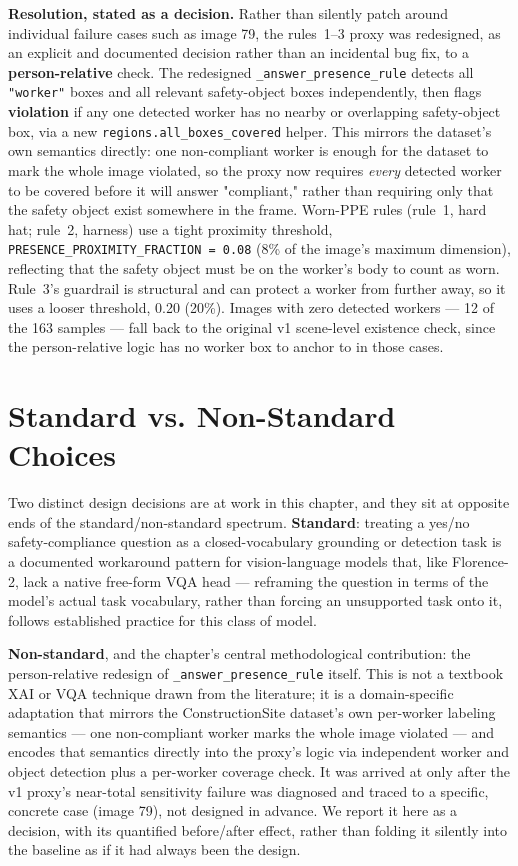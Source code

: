 \textbf{Resolution, stated as a decision.} Rather than silently patch around individual failure
cases such as image 79, the rules~1--3 proxy was redesigned, as an explicit and documented decision
rather than an incidental bug fix, to a \textbf{person-relative} check. The redesigned
\texttt{\_answer\_presence\_rule} detects all \texttt{"worker"} boxes and all relevant safety-object
boxes independently, then flags \textbf{violation} if any one detected worker has no nearby or
overlapping safety-object box, via a new \texttt{regions.all\_boxes\_covered} helper. This
mirrors the dataset's own semantics directly: one non-compliant worker is enough for the dataset to
mark the whole image violated, so the proxy now requires \emph{every} detected worker to be covered
before it will answer "compliant," rather than requiring only that the safety object exist
somewhere in the frame. Worn-PPE rules (rule~1, hard hat; rule~2, harness) use a tight proximity
threshold, \texttt{PRESENCE\_PROXIMITY\_FRACTION = 0.08} (8\% of the image's maximum dimension),
reflecting that the safety object must be on the worker's body to count as worn. Rule~3's
guardrail is structural and can protect a worker from further away, so it uses a looser threshold,
0.20 (20\%). Images with zero detected workers --- 12 of the 163 samples --- fall back to the
original v1 scene-level existence check, since the person-relative logic has no worker box to
anchor to in those cases.

\section{Standard vs. Non-Standard Choices}

Two distinct design decisions are at work in this chapter, and they sit at opposite ends of the
standard/non-standard spectrum. \textbf{Standard}: treating a yes/no safety-compliance question as
a closed-vocabulary grounding or detection task is a documented workaround pattern for
vision-language models that, like Florence-2, lack a native free-form VQA head --- reframing the
question in terms of the model's actual task vocabulary, rather than forcing an unsupported task
onto it, follows established practice for this class of model.

\textbf{Non-standard}, and the chapter's central methodological contribution: the person-relative
redesign of \texttt{\_answer\_presence\_rule} itself. This is not a textbook XAI or VQA technique
drawn from the literature; it is a domain-specific adaptation that mirrors the ConstructionSite
dataset's own per-worker labeling semantics --- one non-compliant worker marks the whole image
violated --- and encodes that semantics directly into the proxy's logic via independent worker and
object detection plus a per-worker coverage check. It was arrived at only after the v1 proxy's
near-total sensitivity failure was diagnosed and traced to a specific, concrete case (image 79), not
designed in advance. We report it here as a decision, with its quantified before/after effect, rather
than folding it silently into the baseline as if it had always been the design.

